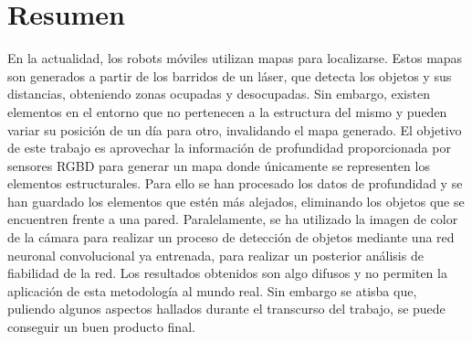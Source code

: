 

\usepackage[
backend=biber,
style=numeric,
sorting=none,
dateabbrev=false,
citestyle=numeric
]{biblatex}




\usepackage[font=footnotesize, skip=4pt, justification=centering]{caption}

\raggedbottom

\usepackage{array}




\pagestyle{fancy}

\maketitle

\chapter*{Resumen}
\setcounter{page}{5} %

En la actualidad, los robots móviles utilizan mapas para localizarse. Estos mapas son generados a partir de los barridos de un láser, que detecta los objetos y sus distancias, obteniendo zonas ocupadas y desocupadas. Sin embargo, existen elementos en el entorno que no pertenecen a la estructura del mismo y pueden variar su posición de un día para otro, invalidando el mapa generado. El objetivo de este trabajo es aprovechar la información de profundidad proporcionada por sensores RGBD para generar un mapa donde únicamente se representen los elementos estructurales. Para ello se han procesado los datos de profundidad y se han guardado los elementos que estén más alejados, eliminando los objetos que se encuentren frente a una pared. Paralelamente, se ha utilizado la imagen de color de la cámara para realizar un proceso de detección de objetos mediante una red neuronal convolucional ya entrenada, para realizar un posterior análisis de fiabilidad de la red. Los resultados obtenidos son algo difusos y no permiten la aplicación de esta metodología al mundo real. Sin embargo se atisba que, puliendo algunos aspectos hallados durante el transcurso del trabajo, se puede conseguir un buen producto final.\\




